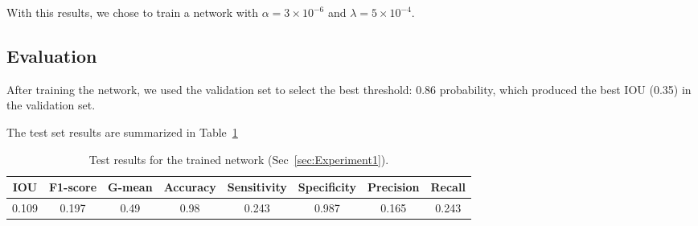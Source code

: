 With this results, we chose to train a network with $\alpha = 3 \times 10^{-6}$ and $\lambda = 5 \times 10^{-4}$.

\subsection{Evaluation}
After training the network, we used the validation set to select the best threshold: 0.86 probability, which produced the best IOU (0.35) in the validation set.

The test set results are summarized in Table~\ref{tab:Results1}
\begin{table}[h]
	\centering
	\begin{tabular}{cccccccc}
	\hline
	\textbf{IOU}	& \textbf{F1-score}	& \textbf{G-mean} &\textbf{Accuracy}	& \textbf{Sensitivity} & \textbf{Specificity} & \textbf{Precision} & \textbf{Recall}\\
	\hline
	0.109 & 0.197 & 0.49 & 0.98 & 0.243 & 0.987 & 0.165 & 0.243 \\
	\hline
	\end{tabular}
	\caption[Results for Experiment 1]{Test results for the trained network (Sec~\ref{sec:Experiment1}).}
	\label{tab:Results1}
\end{table}


